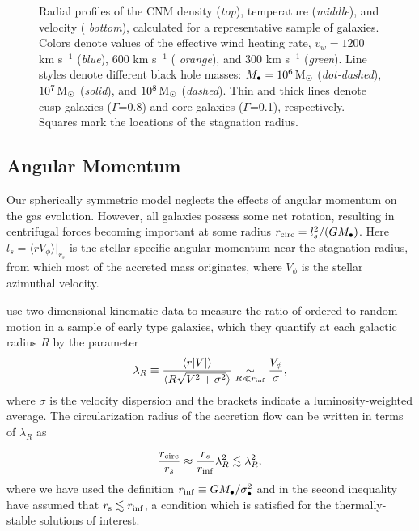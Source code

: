 \documentclass[usenatbib,fleqn]{mn2e}
\newcommand{\Mbh}[1][]{M_{\bullet#1}}
\newcommand{\vwO}{v_{w}}
\begin{document}
\begin{figure}
  \caption{\label{fig:profiles}Radial profiles of the CNM density
    ({\it top}), temperature ({\it middle}), and velocity ({\it
      bottom}), calculated for a representative sample of galaxies.
    Colors denote values of the effective wind heating rate,
    $\vwO=1200$ km s$^{-1}$ ({\it blue}), 600 km s$^{-1}$ ({\it
      orange}), and 300 km s$^{-1}$ ({\it green}).  Line styles denote
    different black hole masses: $\Mbh=10^6 \Msun$ ({\it dot-dashed}),
    $10^7 \,{\rm M_\odot}$ ({\it solid}), and $10^8 \,{\rm M_\odot}$ ({\it dashed}). Thin
    and thick lines denote cusp galaxies ($\Gamma$=0.8) and core
    galaxies ($\Gamma$=0.1), respectively.  Squares mark the locations
    of the stagnation radius.  }
\end{figure}


  \subsection{Angular Momentum}
  \label{sec:rotation}

  Our spherically symmetric model neglects the effects of angular
  momentum on the gas evolution.  However, all galaxies possess some
  net rotation, resulting in centrifugal forces becoming important at
  some radius $r_{\rm circ} = l^{2}_{s}/(GM_{\bullet})$.  Here
  $l_{s} = \langle r V_{\phi}\rangle |_{r_s}$ is the stellar
  specific angular momentum near the stagnation radius, from which
  most of the accreted mass originates, where $V_{\phi}$ is the
  stellar azimuthal velocity.

  \citet{EmsellemCappellari+:2007a} use two-dimensional kinematic data
  to measure the ratio of ordered to random motion in a sample of
  early type galaxies, which they quantify at each galactic radius $R$
  by the parameter
  \begin{align}
    \lambda_R \equiv \frac{\langle r|V|\rangle}{\langle R\sqrt{V^2+\sigma^2}\rangle} \underset{R \ll r_{\rm inf}}\sim \frac{V_{\phi}}{\sigma},
  \end{align}
  where $\sigma$ is the velocity dispersion and the brackets indicate
  a luminosity-weighted average.  The circularization radius of the
  accretion flow can be written in terms of $\lambda_R$ as

\begin{equation}
\frac{r_{\rm circ}}{r_{s}} \approx \frac{r_{s}}{r_{\rm inf}}\lambda_{R}^{2} \lesssim \lambda_{R}^{2},
\label{eq:rcirc}
\end{equation}
where we have used the definition $r_{\rm inf} \equiv
GM_{\bullet}/\sigma_{\bullet}^{2}$ and in the second inequality have assumed
that $r_{\rm s} \lesssim r_{\rm inf}$, a condition which is satisfied
for the thermally-stable solutions of interest.
\end{document}
